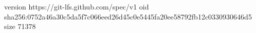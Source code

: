 version https://git-lfs.github.com/spec/v1
oid sha256:0752a46a30c5da5f7c066eed26d45c0e5445fa20ee58792fb12c0330930646d5
size 71378

